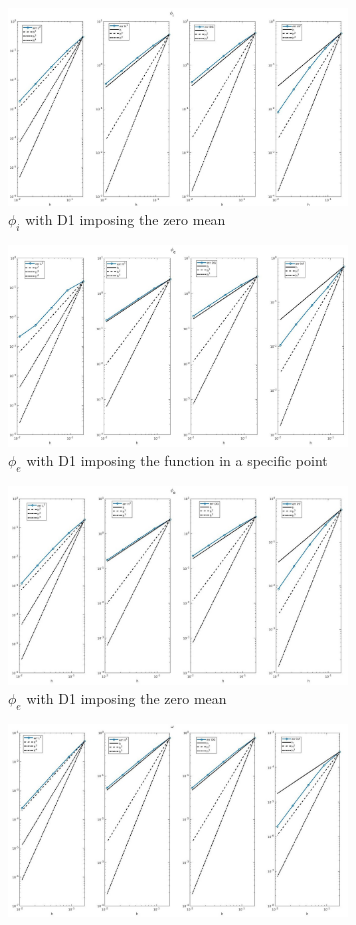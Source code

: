 \documentclass[a4paper,11pt]{article}
\begin{document}
\begin{figure}[h]
\begin{subfigure}{0.5\textwidth}
\includegraphics[width =9cm]{./D1_Phii_2.jpg}
\caption*{$\phi_i$ with D1 imposing the zero mean}
\label{Phii_2}
\end{subfigure}
\begin{subfigure}{0.5\textwidth}
\includegraphics[width = 9cm]{./D1_Phie_1.jpg}
\caption*{$\phi_e$ with D1 imposing the function in a specific point}
\label{Phie_1}
\end{subfigure}
\begin{subfigure}{0.5\textwidth}
\includegraphics[width =9cm]{./D1_Phie_2.jpg}
\caption*{$\phi_e$ with D1 imposing the zero mean}
\label{Phie_2}
\end{subfigure}
\begin{subfigure}{0.5\textwidth}
\includegraphics[width = 9cm]{./D1_w_1.jpg}

\end{subfigure}
\end{figure}
\end{document}
